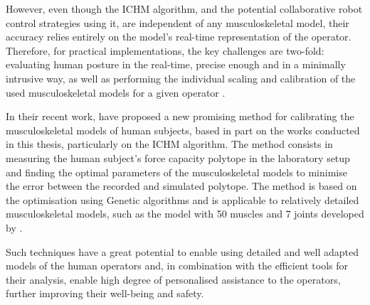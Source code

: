 However, even though the ICHM algorithm, and the potential collaborative robot control strategies using it, are independent of any musculoskeletal model, their accuracy relies entirely on the model's real-time representation of the operator. Therefore, for practical implementations, the key challenges are two-fold: evaluating human posture in the real-time, precise enough and in a minimally intrusive way, as well as performing the individual scaling and calibration of the used musculoskeletal models for a given operator \cite{correa20112782}.

In their recent work, \citet{laisne2023Genetic} have proposed a new promising method for calibrating the musculoskeletal models of human subjects, based in part on the works conducted in this thesis, particularly on the ICHM algorithm. The method consists in measuring the human subject's force capacity polytope in the laboratory setup and finding the optimal parameters of the musculoskeletal models to minimise the error between the recorded and simulated polytope. The method is based on the optimisation using Genetic algorithms and is applicable to relatively detailed musculoskeletal models, such as the model with 50 muscles and 7 joints developed by \citet{holzbaur2005model}.

Such techniques have a great potential to enable using detailed and well adapted models of the human operators and, in combination with the efficient tools for their analysis, enable high degree of personalised assistance to the operators, further improving their well-being and safety.
